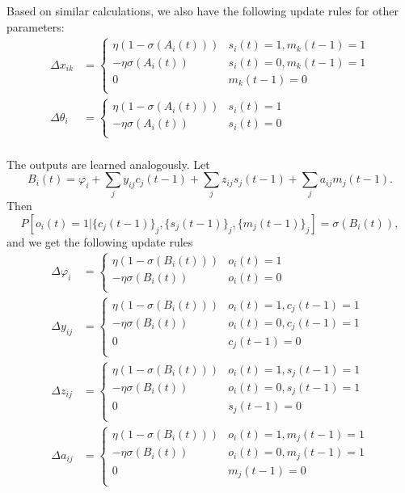 \documentclass{article}
\theoremstyle{definition}
\begin{document}
Based on similar calculations, we also have the following update rules
for other parameters:
\begin{align*}
\Delta x_{ik} &= \begin{cases} \eta (1-\sigma(A_i(t))) & s_i(t)=1, m_k(t-1)=1 \\
-\eta \sigma(A_i(t)) & s_i(t)=0, m_k(t-1)=1 \\
0 & m_k(t-1)=0\\
\end{cases}\\
\Delta \theta_i &= \begin{cases} \eta (1-\sigma(A_i(t))) & s_i(t)=1\\
-\eta \sigma(A_i(t)) & s_i(t)=0\\
\end{cases}\\
\end{align*}

The outputs are learned analogously. Let
$$B_i(t) = \varphi_i + \sum_{j} y_{ij} c_j(t-1) + \sum_j z_{ij} s_j(t-1) + \sum_j a_{ij} m_j(t-1).$$
Then
$$P[o_i(t) = 1 | \{c_j(t-1)\}_j, \{s_j(t-1)\}_j, \{m_j(t-1)\}_j]
= \sigma(B_i(t)),$$
and we get the following update rules
\begin{align*}
\Delta \varphi_i &= \begin{cases} \eta (1-\sigma(B_i(t))) & o_i(t)=1\\
-\eta \sigma(B_i(t)) & o_i(t)=0\\
\end{cases}\\
\Delta y_{ij} &= \begin{cases} \eta (1-\sigma(B_i(t))) & o_i(t)=1, c_j(t-1)=1 \\
-\eta \sigma(B_i(t)) & o_i(t)=0, c_j(t-1)=1 \\
0 & c_j(t-1)=0\\
\end{cases}\\
\Delta z_{ij} &= \begin{cases} \eta (1-\sigma(B_i(t))) & o_i(t)=1, s_j(t-1)=1 \\
- \eta \sigma(B_i(t)) & o_i(t)=0, s_j(t-1)=1\\
0 & s_j(t-1)=0\\
\end{cases}\\
\Delta a_{ij} &= \begin{cases} \eta (1-\sigma(B_i(t))) & o_i(t)=1, m_j(t-1)=1 \\
- \eta \sigma(B_i(t)) & o_i(t)=0, m_j(t-1)=1\\
0 & m_j(t-1)=0\\
\end{cases}
\end{align*}
\end{document}
